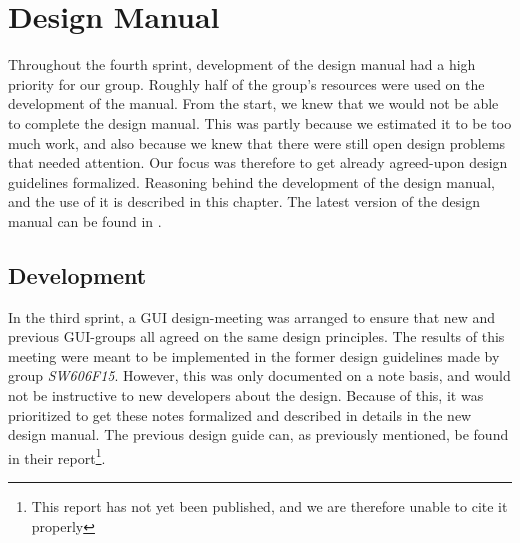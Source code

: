 
\chapter{Design Manual}
\label{cha:design_manual}

Throughout the fourth sprint, development of the design manual had a high priority for our group. Roughly half of the group's resources were used on the development of the manual. From the start, we knew that we would not be able to complete the design manual. This was partly because we estimated it to be too much work, and also because we knew that there were still open design problems that needed attention. Our focus was therefore to get already agreed-upon design guidelines formalized. Reasoning behind the development of the design manual, and the use of it is described in this chapter. The latest version of the design manual can be found in .

\section{Development}
\label{sec:development}
In the third sprint, a GUI design-meeting was arranged to ensure that new and previous GUI-groups all agreed on the same design principles.  The results of this meeting were meant to be implemented in the former design guidelines made by group \emph{SW606F15}. However, this was only documented on a note basis, and would not be instructive to new \giraf developers about the design. Because of this, it was prioritized to get these notes formalized and described in details in the new design manual. The previous design guide can, as previously mentioned, be found in their report\footnote{This report has not yet been published, and we are therefore unable to cite it properly}.

